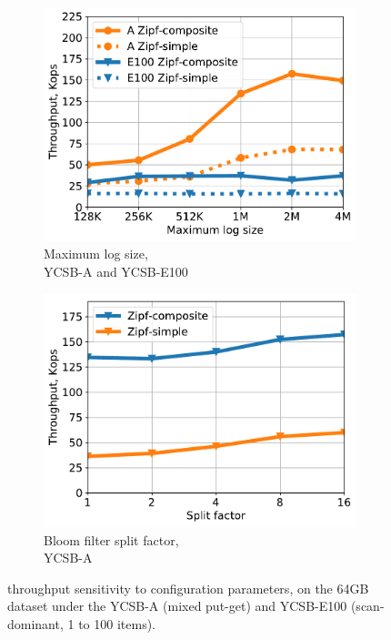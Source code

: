 \begin{figure}[htb]
\centering
\begin{subfigure}{0.49\linewidth}
\includegraphics[width=\textwidth]{figs/max_log_size_line.pdf}
\caption{Maximum log size,\\  YCSB-A and YCSB-E100}
\label{fig:params:log}
\end{subfigure}
\begin{subfigure}{0.49\linewidth}
\includegraphics[width=\textwidth]{figs/Bloom_filter_line.pdf}
\caption{Bloom filter split factor,\\ YCSB-A}
\label{fig:params:bf}
\end{subfigure}
\caption{{\sys\/ throughput sensitivity to configuration parameters, on the 64GB dataset under the YCSB-A (mixed put-get) and 
YCSB-E100 (scan-dominant, 1 to 100 items).}}
\label{fig:params}
\end{figure}

